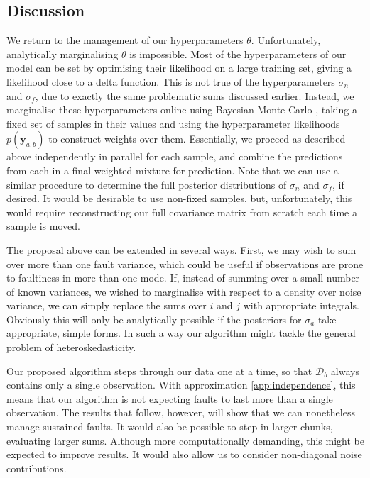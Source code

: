 \documentclass{article} %
\newcommand{\cm}[1]{\ensuremath{\mathcal{#1}}}
\newcommand{\bm}[1]{\ensuremath{\mathbf{#1}}}
\newcommand{\data}{\ensuremath{\cm{D}}}
\newcommand{\vect}[1]{\bm{#1}}
\newcommand{\vy}{\vect{y}}
\begin{document}
\subsection{Discussion}

We return to the management of our hyperparameters
$\theta$. Unfortunately, analytically marginalising $\theta$ is
impossible. Most of the hyperparameters of our model can be set by
optimising their likelihood on a large training set, giving a
likelihood close to a delta function. This is not true of the
hyperparameters $\sigma_n$ and $\sigma_f$, due to exactly the same
problematic sums discussed earlier. Instead, we marginalise these
hyperparameters online using Bayesian Monte Carlo \citep[Chapter
  7]{osbornebayesian}, taking a fixed set of samples in their values
and using the hyperparameter likelihoods $p(\vy_{a,b})$ to construct
weights over them. Essentially, we proceed as described above
independently in parallel for each sample, and combine the predictions
from each in a final weighted mixture for prediction. Note that we can
use a similar procedure \citep{garnettosborne} to determine the full
posterior distributions of $\sigma_n$ and $\sigma_f$, if desired.  It
would be desirable to use non-fixed samples, but, unfortunately, this
would require reconstructing our full covariance matrix from
scratch each time a sample is moved.

The proposal above can be extended in several ways. First, we may wish
to sum over more than one fault variance, which could be useful if
observations are prone to faultiness in more than one mode.  If, instead of summing over a small number of known variances, we
wished to marginalise with respect to a density over noise variance,
we can simply replace the sums over $i$ and $j$ with appropriate
integrals. Obviously this will only be analytically possible if the
posteriors for $\sigma_a$ take appropriate, simple forms.  In such a way our algorithm might tackle the general problem of
heteroskedasticity.


Our proposed algorithm steps through our data one at a time, so that
$\data_b$ always contains only a single observation. 
With approximation \ref{app:independence}, this means that our algorithm is not expecting faults to last more than a single observation. The results that follow, however, will show that we can nonetheless manage sustained faults. 
It would also
be possible to step in larger chunks, evaluating larger
sums. Although more computationally demanding, this might be expected
to improve results. It would also allow us to consider non-diagonal
noise contributions.
\end{document}
